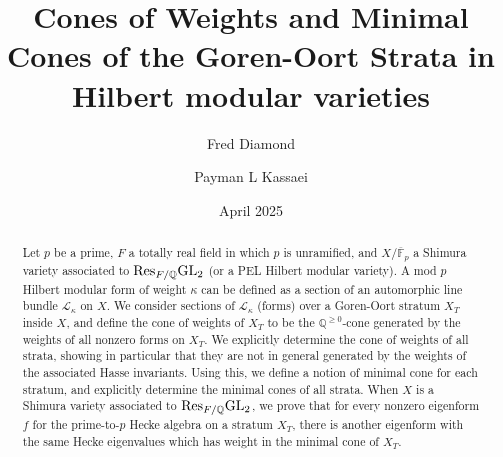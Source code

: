 \documentclass[11pt,pdflatex]{amsart}
\theoremstyle{plain}
\theoremstyle{definition}
\newcommand{\FF}{\mathbf{F}}
\newcommand{\QQ}{\mathbf{Q}}
\newcommand{\Fpbar}{{\overline{\FF}_p}}
\theoremstyle{plain}
\theoremstyle{definition}
\theoremstyle{remark}
\numberwithin{equation}{section}
\numberwithin{figure}{section} \numberwithin{table}{subsection}
\newcommand{\calL}{{\mathcal{L}}}
\def\FF{\mathbb{F}}
\def\QQ{\mathbb{Q}}
\begin{document}
\title[Cones of Weights and Minimal Cones of Strata]{Cones of Weights and Minimal Cones of the Goren-Oort Strata in Hilbert modular varieties}



\author{Fred Diamond}
\address{Department of Mathematics,
King's College London, WC2R 2LS, UK}
\author{Payman L Kassaei}
\address{Department of Mathematics,
King's College London, WC2R 2LS, UK}

 
\date{April 2025}

 


\begin{abstract}  Let $p$ be a prime, $F$ a totally real field in which $p$ is unramified, and $X/\Fpbar$ a Shimura variety associated to ${\rm Res}_{F/\QQ} {\rm GL}_2$ (or a PEL Hilbert modular variety).  A mod $p$ Hilbert modular form of weight $\kappa$ can be defined as a section of an automorphic line bundle $\calL_\kappa$ on $X$. We consider sections of $\calL_\kappa$ (forms) over a Goren-Oort stratum $X_T$ inside $X$, and define the cone of weights of $X_T$ to be the $\QQ^{\geq 0}$-cone generated by the weights of all nonzero  forms on $X_T$. We explicitly determine the cone of weights of all strata, showing in particular that they are not in general generated by the weights of the associated Hasse invariants. Using this, we define a notion of minimal cone for each stratum, and explicitly determine the minimal cones of all strata. When $X$ is a Shimura variety associated to ${\rm Res}_{F/\QQ} {\rm GL}_2$, we prove that for every nonzero eigenform $f$ for the prime-to-$p$ Hecke algebra on a stratum $X_T$, there is another eigenform with the same Hecke eigenvalues which has weight in the minimal cone of $X_T$.
\end{abstract}
\maketitle
\end{document}
